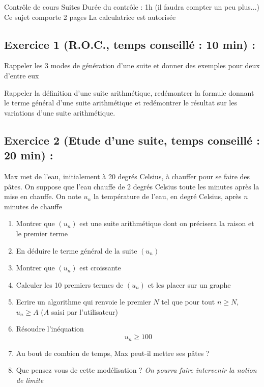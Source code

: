 

\usepackage{tcolorbox}



\center
\Large Contrôle de cours
\flushleft
\center
Suites
\flushleft \normalsize
Durée du contrôle : 1h (il faudra compter un peu plus...)\newline
Ce sujet comporte 2 pages\newline
La calculatrice est autorisée
\subsection*{Exercice 1 (R.O.C., temps conseillé : 10 min) : }
Rappeler les 3 modes de génération d'une suite et donner des exemples pour deux d'entre eux\newline

Rappeler la définition d'une suite arithmétique, redémontrer la formule donnant le terme général d'une suite arithmétique et redémontrer le résultat sur les variations d'une suite arithmétique.
\subsection*{Exercice 2 (Etude d'une suite, temps conseillé : 20 min) : }
Max met de l'eau, initialement à 20 degrés Celsius, à chauffer pour se faire des pâtes. On suppose que l'eau chauffe de 2 degrés Celsius toute les minutes après la mise en chauffe. On note $u_n$ la température de l'eau, en degré Celsius, après $n$ minutes de chauffe
\begin{enumerate}
\item Montrer que $(u_n)$ est une suite arithmétique dont on précisera la raison et le premier terme
\item En déduire le terme général de la suite $(u_n)$
\item Montrer que $(u_n)$ est croissante
\item Calculer les 10 premiers termes de $(u_n)$ et les placer sur un graphe
\item Ecrire un algorithme qui renvoie le premier $N$ tel que pour tout $n\geq N$, $u_n \geq A$ ($A$ saisi par l'utilisateur)
\item Résoudre l'inéquation 
$$u_n \geq 100$$
\item Au bout de combien de temps, Max peut-il mettre ses pâtes ?
\item Que pensez vous de cette modélisation ? \emph{On pourra faire intervenir la notion de limite}
\end{enumerate}
